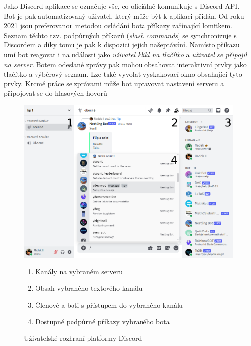 \documentclass[FM]{tulthesis}
\begin{document}
	Jako Discord aplikace se označuje vše, co oficiálně komunikuje s Discord API. Bot je pak automatizovaný uživatel, který může být k aplikaci přidán. Od roku 2021 jsou preferovanou metodou ovládání bota příkazy začínající lomítkem. Seznam těchto tzv. podpůrných příkazů (\textit{slash commands}) se synchronizuje s Discordem a díky tomu je pak k dispozici jejich našeptávání. Namísto příkazu umí bot reagovat i na události jako \textit{uživatel klikl na tlačítko} a \textit{uživatel se připojil na server}. Botem odeslané zprávy pak mohou obsahovat interaktivní prvky jako tlačítko a výběrový seznam. Lze také vyvolat vyskakovací okno obsahující tyto prvky. Kromě práce se zprávami může bot upravovat nastavení serveru a  připojovat se do hlasových hovorů. \cite{pdf_apps101}
	
	\begin{figure}[ht]
		\centering
		\includegraphics[width=\textwidth]{img/DiscordBotCommands}
		\begin{enumerate}[nolistsep]
			\item Kanály na vybraném serveru
			\item Obsah vybraného textového kanálu
			\item Členové a boti s přístupem do vybraného kanálu
			\item Dostupné podpůrné příkazy vybraného bota
		\end{enumerate}
		\caption{Uživatelské rozhraní platformy Discord}		
	\end{figure}
	
\end{document}
